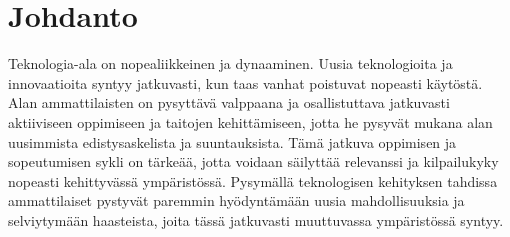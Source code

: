 \documentclass[11pt,a4paper,titlepage,oneside]{article}
\begin{document}
    






\section{Johdanto}              %




Teknologia-ala on nopealiikkeinen ja dynaaminen. 
Uusia teknologioita ja innovaatioita syntyy jatkuvasti, kun taas vanhat poistuvat nopeasti käytöstä.
Alan ammattilaisten on pysyttävä valppaana ja osallistuttava jatkuvasti aktiiviseen oppimiseen ja taitojen kehittämiseen,
jotta he pysyvät mukana alan uusimmista edistysaskelista ja suuntauksista.
Tämä jatkuva oppimisen ja sopeutumisen sykli on tärkeää,
jotta voidaan säilyttää relevanssi ja kilpailukyky nopeasti kehittyvässä ympäristössä.
Pysymällä teknologisen kehityksen tahdissa ammattilaiset pystyvät paremmin hyödyntämään uusia mahdollisuuksia ja selviytymään haasteista,
joita tässä jatkuvasti muuttuvassa ympäristössä syntyy.
\medskip

\end{document}
